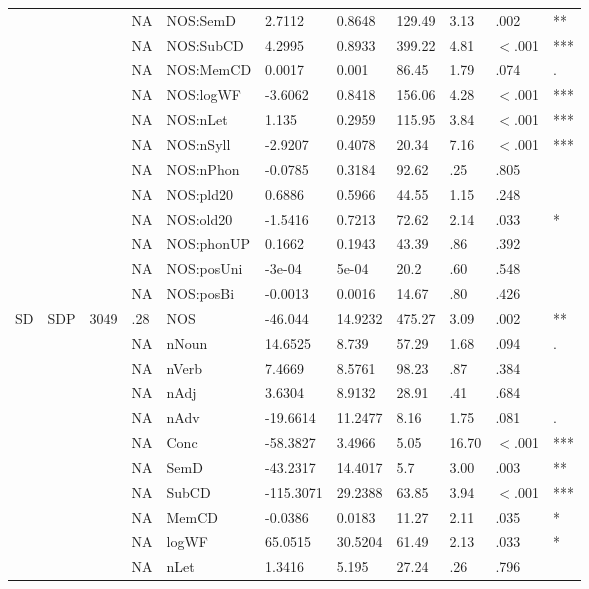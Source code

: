 \begin{table}[ht]
\begin{tabular}{lllllllllll}
   &  &  & NA & NOS:SemD & 2.7112 & 0.8648 & 129.49 & 3.13 & .002 & ** \\ 
   &  &  & NA & NOS:SubCD & 4.2995 & 0.8933 & 399.22 & 4.81 & $<$.001 & *** \\ 
   &  &  & NA & NOS:MemCD & 0.0017 & 0.001 & 86.45 & 1.79 & .074 & . \\ 
   &  &  & NA & NOS:logWF & -3.6062 & 0.8418 & 156.06 & 4.28 & $<$.001 & *** \\ 
   &  &  & NA & NOS:nLet & 1.135 & 0.2959 & 115.95 & 3.84 & $<$.001 & *** \\ 
   &  &  & NA & NOS:nSyll & -2.9207 & 0.4078 & 20.34 & 7.16 & $<$.001 & *** \\ 
   &  &  & NA & NOS:nPhon & -0.0785 & 0.3184 & 92.62 & .25 & .805 &   \\ 
   &  &  & NA & NOS:pld20 & 0.6886 & 0.5966 & 44.55 & 1.15 & .248 &   \\ 
   &  &  & NA & NOS:old20 & -1.5416 & 0.7213 & 72.62 & 2.14 & .033 & * \\ 
   &  &  & NA & NOS:phonUP & 0.1662 & 0.1943 & 43.39 & .86 & .392 &   \\ 
   &  &  & NA & NOS:posUni & -3e-04 & 5e-04 & 20.2 & .60 & .548 &   \\ 
   &  &  & NA & NOS:posBi & -0.0013 & 0.0016 & 14.67 & .80 & .426 &   \\ 
  SD & SDP & 3049 & .28 & NOS & -46.044 & 14.9232 & 475.27 & 3.09 & .002 & ** \\ 
   &  &  & NA & nNoun & 14.6525 & 8.739 & 57.29 & 1.68 & .094 & . \\ 
   &  &  & NA & nVerb & 7.4669 & 8.5761 & 98.23 & .87 & .384 &   \\ 
   &  &  & NA & nAdj & 3.6304 & 8.9132 & 28.91 & .41 & .684 &   \\ 
   &  &  & NA & nAdv & -19.6614 & 11.2477 & 8.16 & 1.75 & .081 & . \\ 
   &  &  & NA & Conc & -58.3827 & 3.4966 & 5.05 & 16.70 & $<$.001 & *** \\ 
   &  &  & NA & SemD & -43.2317 & 14.4017 & 5.7 & 3.00 & .003 & ** \\ 
   &  &  & NA & SubCD & -115.3071 & 29.2388 & 63.85 & 3.94 & $<$.001 & *** \\ 
   &  &  & NA & MemCD & -0.0386 & 0.0183 & 11.27 & 2.11 & .035 & * \\ 
   &  &  & NA & logWF & 65.0515 & 30.5204 & 61.49 & 2.13 & .033 & * \\ 
   &  &  & NA & nLet & 1.3416 & 5.195 & 27.24 & .26 & .796 &   \\ 

\end{tabular}
\end{table}
